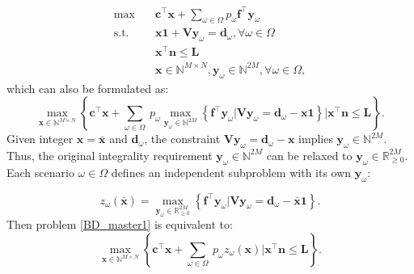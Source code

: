 \begin{equation}\label{BD_master}
  \begin{aligned}
  \max \quad & \mathbf{c}^{\intercal} \mathbf{x}+ \sum_{\omega \in \Omega} p_{\omega} \mathbf{f}^{\intercal} \mathbf{y}_{\omega} \\
  \text {s.t.} \quad & \mathbf{x} \mathbf{1} + \mathbf{V} \mathbf{y}_{\omega} = \mathbf{d}_{\omega}, \forall \omega \in \Omega  \\
  & \mathbf{x}^{\intercal} \mathbf{n} \leq \mathbf{L} \\
  & \mathbf{x} \in \mathbb{N}^{M \times N}, \mathbf{y}_{\omega} \in \mathbb{N}^{2M}, \forall \omega \in \Omega, 
  \end{aligned}
\end{equation}
which can also be formulated as:
\begin{equation}\label{BD_master1}
  \max_{\mathbf{x} \in \mathbb{N}^{M \times N}} \left\{ \mathbf{c}^{\intercal} \mathbf{x} + \sum_{\omega \in \Omega} ~ p_{\omega} \max_{\mathbf{y}_{\omega} \in \mathbb{N}^{\scriptscriptstyle 2M}} \left\{\mathbf{f}^{\intercal} \mathbf{y}_{\omega} \big| \mathbf{V} \mathbf{y}_{\omega} = \mathbf{d}_{\omega} -\mathbf{x} \mathbf{1}\right\} \bigg| \mathbf{x}^{\intercal} \mathbf{n} \leq \mathbf{L} \right\}.
\end{equation}
Given integer $\mathbf{x} = \mathbf{\bar{x}}$ and $\mathbf{d}_{\omega}$, the constraint $\mathbf{V} \mathbf{y}_{\omega} = \mathbf{d}_{\omega} -\mathbf{x}$ implies $\mathbf{y}_{\omega} \in \mathbb{N}^{2M}$. Thus, the original integrality requirement $\mathbf{y}_{\omega} \in \mathbb{N}^{2M}$ can be relaxed to $\mathbf{y}_{\omega} \in \mathbb{R}^{2M}_{\scriptscriptstyle \geq 0}$.
Each scenario $\omega \in \Omega$ defines an independent subproblem with its own $\mathbf{y}_{\omega}$:

\begin{equation}\label{BD_sub}
  z_{\omega}(\mathbf{\bar{x}}) = \max_{\mathbf{y}_{\omega} \in \mathbb{R}^{2M}_{\scriptscriptstyle \geq 0}} \left\{
  \mathbf{f}^{\intercal} \mathbf{y}_{\omega}\Big| \mathbf{V} \mathbf{y}_{\omega} = \mathbf{d}_{\omega} - \mathbf{\bar{x}} \mathbf{1}
  \right\}.
\end{equation}
Then problem \eqref{BD_master1} is equivalent to:
\begin{equation}\label{BD_master3}
  \max_{\mathbf{x} \in \mathbb{N}^{M \times N}} \left\{ \mathbf{c}^{\intercal} \mathbf{x} + \sum_{\omega \in \Omega} ~ p_{\omega} z_{\omega}(\mathbf{x}) \bigg| \mathbf{x}^{\intercal} \mathbf{n} \leq \mathbf{L} \right\}.
\end{equation}


